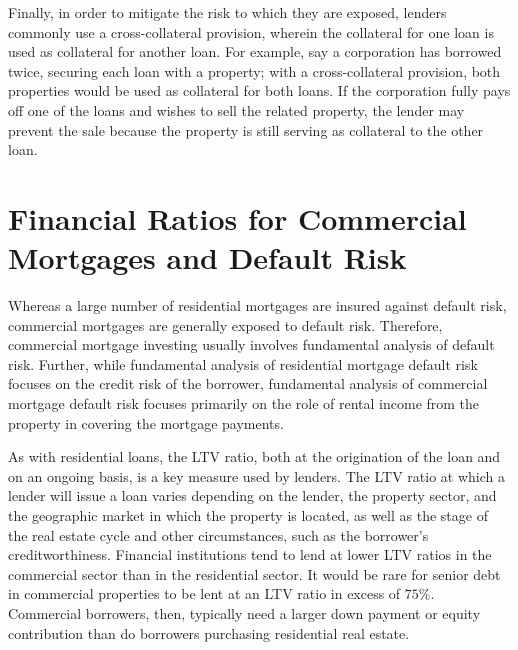 \documentclass[11pt]{article}
\begin{document}
Finally, in order to mitigate the risk to which they are exposed, lenders commonly use a cross-collateral provision, wherein the collateral for one loan is used as collateral for another loan. For example, say a corporation has borrowed twice, securing each loan with a property; with a cross-collateral provision, both properties would be used as collateral for both loans. If the corporation fully pays off one of the loans and wishes to sell the related property, the lender may prevent the sale because the property is still serving as collateral to the other loan.

\section*{Financial Ratios for Commercial Mortgages and Default Risk}
Whereas a large number of residential mortgages are insured against default risk, commercial mortgages are generally exposed to default risk. Therefore, commercial mortgage investing usually involves fundamental analysis of default risk. Further, while fundamental analysis of residential mortgage default risk focuses on the credit risk of the borrower, fundamental analysis of commercial mortgage default risk focuses primarily on the role of rental income from the property in covering the mortgage payments.

As with residential loans, the LTV ratio, both at the origination of the loan and on an ongoing basis, is a key measure used by lenders. The LTV ratio at which a lender will issue a loan varies depending on the lender, the property sector, and the geographic market in which the property is located, as well as the stage of the real estate cycle and other circumstances, such as the borrower's creditworthiness. Financial institutions tend to lend at lower LTV ratios in the commercial sector than in the residential sector. It would be rare for senior debt in commercial properties to be lent at an LTV ratio in excess of $75 \%$. Commercial borrowers, then, typically need a larger down payment or equity contribution than do borrowers purchasing residential real estate.
\end{document}

